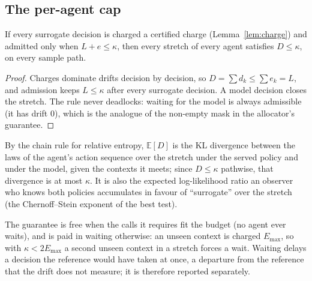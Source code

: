 \subsection{The per-agent cap}
\begin{theorem}\label{thm:cap}
If every surrogate decision is charged a certified charge (Lemma~\ref{lem:charge}) and admitted only
when $L+e\le\kappa$, then every stretch of every agent satisfies $D\le\kappa$, on every sample path.
\end{theorem}
\begin{proof}
Charges dominate drifts decision by decision, so $D=\sum d_k\le\sum e_k=L$, and admission keeps
$L\le\kappa$ after every surrogate decision. A model decision closes the stretch. The rule never
deadlocks: waiting for the model is always admissible (it has drift $0$), which is the analogue of
the non-empty mask in the allocator's guarantee.
\end{proof}
\begin{remark}
By the chain rule for relative entropy, $\mathbb{E}[D]$ is the KL divergence between the laws of the
agent's action sequence over the stretch under the served policy and under the model, given the
contexts it meets; since $D\le\kappa$ pathwise, that divergence is at most $\kappa$. It is also the
expected log-likelihood ratio an observer who knows both policies accumulates in favour of
``surrogate'' over the stretch (the Chernoff--Stein exponent of the best test).
\end{remark}
\begin{remark}
The guarantee is free when the calls it requires fit the budget (no agent ever waits), and is paid in
waiting otherwise: an unseen context is charged $E_{\max}$, so with $\kappa<2E_{\max}$ a second unseen
context in a stretch forces a wait. Waiting delays a decision the reference would have taken at once, a
departure from the reference that the drift does not measure; it is therefore reported separately.
\end{remark}

